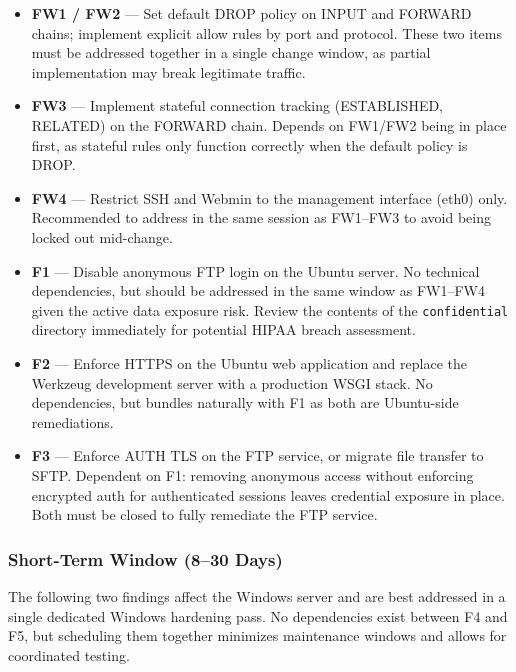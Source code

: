 \documentclass[12pt]{article}
\begin{document}
\begin{itemize}[leftmargin=1.5em]
  \item \textbf{FW1 / FW2} --- Set default DROP policy on INPUT and FORWARD
    chains; implement explicit allow rules by port and protocol. These two items
    must be addressed together in a single change window, as partial
    implementation may break legitimate traffic.
 
  \item \textbf{FW3} --- Implement stateful connection tracking
    (ESTABLISHED, RELATED) on the FORWARD chain. Depends on FW1/FW2 being in
    place first, as stateful rules only function correctly when the default
    policy is DROP.
 
  \item \textbf{FW4} --- Restrict SSH and Webmin to the management interface
    (eth0) only. Recommended to address in the same session as FW1--FW3 to
    avoid being locked out mid-change.
 
  \item \textbf{F1} --- Disable anonymous FTP login on the Ubuntu server. No
    technical dependencies, but should be addressed in the same window as
    FW1--FW4 given the active data exposure risk. Review the contents of the
    \texttt{confidential} directory immediately for potential HIPAA breach
    assessment.
 
  \item \textbf{F2} --- Enforce HTTPS on the Ubuntu web application and replace
    the Werkzeug development server with a production WSGI stack. No
    dependencies, but bundles naturally with F1 as both are Ubuntu-side
    remediations.
 
  \item \textbf{F3} --- Enforce AUTH TLS on the FTP service, or migrate file
    transfer to SFTP. Dependent on F1: removing anonymous access without
    enforcing encrypted auth for authenticated sessions leaves credential
    exposure in place. Both must be closed to fully remediate the FTP service.
\end{itemize}
 
\subsubsection*{Short-Term Window (8--30 Days)}
 
The following two findings affect the Windows server and are best addressed in a
single dedicated Windows hardening pass. No dependencies exist between F4 and
F5, but scheduling them together minimizes maintenance windows and allows for
coordinated testing.
 
\end{document}
